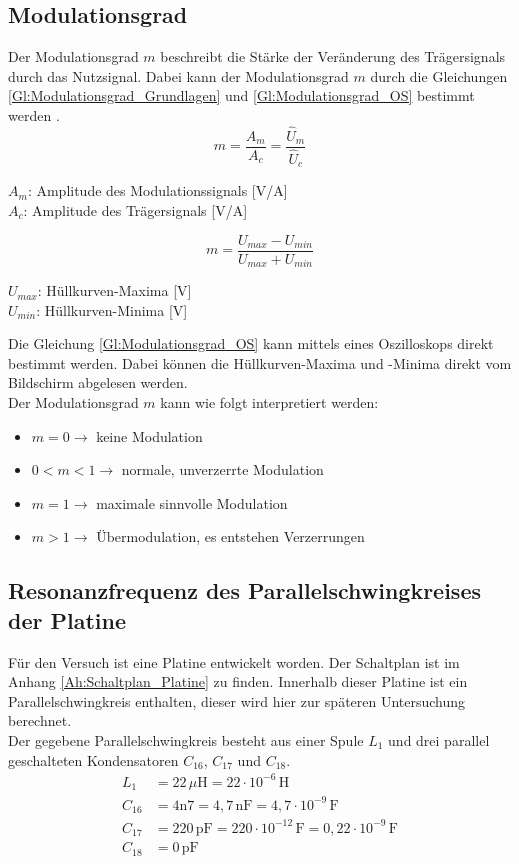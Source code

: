 \documentclass[12pt]{scrartcl}
\begin{document}
\subsection{Modulationsgrad}
\label{Kp:TG_Modulationsgrad}
Der Modulationsgrad $m$ beschreibt die Stärke der Veränderung des Trägersignals durch das Nutzsignal. 
Dabei kann der Modulationsgrad $m$ durch die Gleichungen \ref{Gl:Modulationsgrad_Grundlagen} und \ref{Gl:Modulationsgrad_OS} bestimmt werden \cite{Modulationsgrad}.
\begin{equation}
    m=\frac{A_m}{A_c}=\frac{\hat{U}_m}{\hat{U}_c}
    \label{Gl:Modulationsgrad_Grundlagen}
\end{equation}
\begin{center}
    $A_m$: Amplitude des Modulationssignals [V/A]\\
    $A_c$: Amplitude des Trägersignals [V/A]
\end{center}
\begin{equation}
    m=\frac{U_{max}-U_{min}}{U_{max}+U_{min}}
    \label{Gl:Modulationsgrad_OS}
\end{equation}
\begin{center}
    $U_{max}$: Hüllkurven-Maxima [V]\\
    $U_{min}$: Hüllkurven-Minima [V]
\end{center}
Die Gleichung \ref{Gl:Modulationsgrad_OS} kann mittels eines Oszilloskops direkt bestimmt werden. 
Dabei können die Hüllkurven-Maxima und -Minima direkt vom Bildschirm abgelesen werden.\\
Der Modulationsgrad $m$ kann wie folgt interpretiert werden:
\begin{itemize}
    \item $m=0 \rightarrow$ keine Modulation
    \item $0<m<1 \rightarrow$ normale, unverzerrte Modulation
    \item $m=1 \rightarrow$ maximale sinnvolle Modulation 
    \item $m>1 \rightarrow$ Übermodulation, es entstehen Verzerrungen
\end{itemize}

\subsection{Resonanzfrequenz des Parallelschwingkreises der Platine}
\label{kap:Resonanzfrequenz}
Für den Versuch ist eine Platine entwickelt worden. 
Der Schaltplan ist im Anhang \ref{Ah:Schaltplan_Platine} zu finden.
Innerhalb dieser Platine ist ein Parallelschwingkreis enthalten, dieser wird hier zur späteren Untersuchung berechnet.\\
Der gegebene Parallelschwingkreis besteht aus einer Spule $L_1$ und drei parallel geschalteten Kondensatoren $C_{16}$, $C_{17}$ und $C_{18}$.
\begin{align*}
    L_1    &= 22\,\mu\text{H} = 22 \cdot 10^{-6}\,\text{H} \\
    C_{16} &= 4\text{n}7 = 4,7\,\text{nF} = 4,7 \cdot 10^{-9}\,\text{F} \\
    C_{17} &= 220\,\text{pF} = 220 \cdot 10^{-12}\,\text{F} = 0,22 \cdot 10^{-9}\,\text{F} \\
    C_{18} &= 0\,\text{pF}
\end{align*}
 
\end{document}
